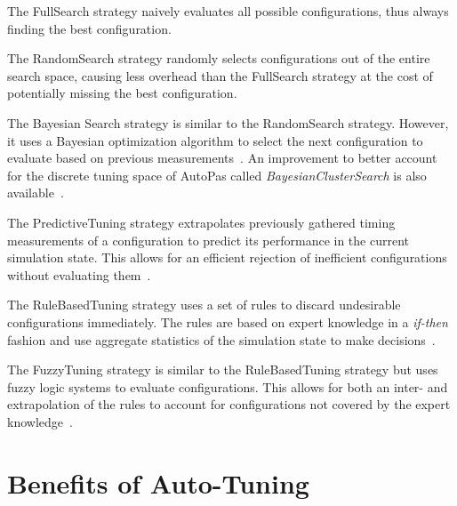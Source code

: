 \documentclass[conference]{IEEEtran}
\begin{document}
\begin{description}[style=nextline]
    \item[FullSearch]
        The FullSearch strategy naively evaluates all possible configurations, thus always finding the best configuration.

    \item[RandomSearch]
        The RandomSearch strategy randomly selects configurations out of the entire search space, causing less overhead than the FullSearch strategy at the cost of potentially missing the best configuration.

    \item[BayesianSearch]
        The Bayesian Search strategy is similar to the RandomSearch strategy. However, it uses a Bayesian optimization algorithm to select the next configuration to evaluate based on previous measurements~\cite{njan_master}. An improvement to better account for the discrete tuning space of AutoPas called \textit{BayesianClusterSearch} is also available~\cite{njan_master}.

    \item[PredictiveTuning]
        The PredictiveTuning strategy extrapolates previously gathered timing measurements of a configuration to predict its performance in the current simulation state. This allows for an efficient rejection of inefficient configurations without evaluating them~\cite{pelloth2020}.

    \item[RuleBasedTuning]
        The RuleBasedTuning strategy uses a set of rules to discard undesirable configurations immediately. The rules are based on expert knowledge in a \textit{if-then} fashion and use aggregate statistics of the simulation state to make decisions~\cite{endreport.pdf}.

    \item[FuzzyTuning]
        The FuzzyTuning strategy is similar to the RuleBasedTuning strategy but uses fuzzy logic systems to evaluate configurations. This allows for both an inter- and extrapolation of the rules to account for configurations not covered by the expert knowledge~\cite{Manuel_Lerchner_Thesis.pdf}.

\end{description}

\section{Benefits of Auto-Tuning}
\end{document}
